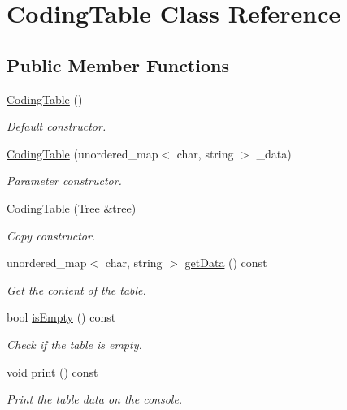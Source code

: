 \hypertarget{class_coding_table}{}\section{Coding\+Table Class Reference}
\label{class_coding_table}
\subsection*{Public Member Functions}
\begin{DoxyCompactItemize}
\item 
\mbox{\label{class_coding_table_aa084c590397a28dce6a1f30debb679af}} 
\mbox{\hyperlink{class_coding_table_aa084c590397a28dce6a1f30debb679af}{Coding\+Table}} ()
\begin{DoxyCompactList}\small\item\em Default constructor. \end{DoxyCompactList}\item 
\mbox{\label{class_coding_table_a9a0bd4c15ee8cc2f87c87835e56cc52f}} 
\mbox{\hyperlink{class_coding_table_a9a0bd4c15ee8cc2f87c87835e56cc52f}{Coding\+Table}} (unordered\+\_\+map$<$ char, string $>$ \+\_\+data)
\begin{DoxyCompactList}\small\item\em Parameter constructor. \end{DoxyCompactList}\item 
\mbox{\label{class_coding_table_a1bd8e80f18829b64f50abc1260a5273c}} 
\mbox{\hyperlink{class_coding_table_a1bd8e80f18829b64f50abc1260a5273c}{Coding\+Table}} (\mbox{\hyperlink{class_tree}{Tree}} \&tree)
\begin{DoxyCompactList}\small\item\em Copy constructor. \end{DoxyCompactList}\item 
unordered\+\_\+map$<$ char, string $>$ \mbox{\hyperlink{class_coding_table_af896cb49760b28f88dcc3524f4972058}{get\+Data}} () const
\begin{DoxyCompactList}\small\item\em Get the content of the table. \end{DoxyCompactList}\item 
bool \mbox{\hyperlink{class_coding_table_a48c523f7f362f31cef5da3385b1e1198}{is\+Empty}} () const
\begin{DoxyCompactList}\small\item\em Check if the table is empty. \end{DoxyCompactList}\item 
\mbox{\label{class_coding_table_a648a57cf74a5ee174a56ea1981cabdb4}} 
void \mbox{\hyperlink{class_coding_table_a648a57cf74a5ee174a56ea1981cabdb4}{print}} () const
\begin{DoxyCompactList}\small\item\em Print the table data on the console. \end{DoxyCompactList}\end{DoxyCompactItemize}
